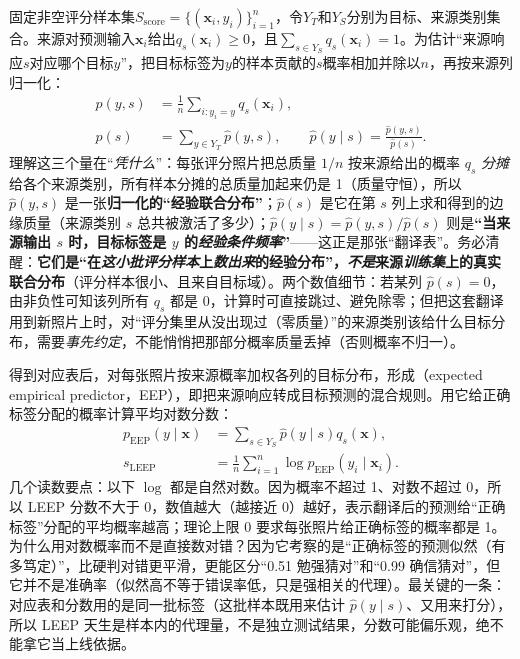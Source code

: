 固定非空评分样本集$S_{\mathrm{score}}=\{(\bm x_i,y_i)\}_{i=1}^{n}$，令$Y_T$和$Y_S$分别为目标、来源类别集合。来源对预测输入$\bm x_i$给出$q_s(\bm x_i)\geq0$，且$\sum_{s\in Y_S}q_s(\bm x_i)=1$。为估计“来源响应$s$对应哪个目标$y$”，把目标标签为$y$的样本贡献的$s$概率相加并除以$n$，再按来源列归一化：
\begin{equation}
  \begin{aligned}
    \hat p(y,s)&=\frac1n\sum_{i:y_i=y}q_s(\bm x_i),\\
    \hat p(s)&=\sum_{y\in Y_T}\hat p(y,s),\qquad
    \hat p(y\mid s)=\frac{\hat p(y,s)}{\hat p(s)}.
  \end{aligned}
  \label{eq:ket-reuse-leep-joint}
\end{equation}
理解这三个量在“\emph{凭什么}”：每张评分照片把总质量 $1/n$ 按来源给出的概率 $q_s$ \emph{分摊}给各个来源类别，所有样本分摊的总质量加起来仍是 1（质量守恒），所以 $\hat p(y,s)$ 是一张\textbf{归一化的“经验联合分布”}；$\hat p(s)$ 是它在第 $s$ 列上求和得到的边缘质量（来源类别 $s$ 总共被激活了多少）；$\hat p(y\mid s)=\hat p(y,s)/\hat p(s)$ 则是\textbf{“当来源输出 $s$ 时，目标标签是 $y$ 的\emph{经验条件频率}”}——这正是那张“翻译表”。务必清醒：\textbf{它们是“在\emph{这小批评分样本}上\emph{数出来}的经验分布”，\emph{不是}来源\emph{训练集}上的真实联合分布}（评分样本很小、且来自目标域）。两个数值细节：若某列 $\hat p(s)=0$，由非负性可知该列所有 $q_s$ 都是 0，计算时可直接跳过、避免除零；但把这套翻译用到新照片上时，对“评分集里从没出现过（零质量）”的来源类别该给什么目标分布，需要\emph{事先约定}，不能悄悄把那部分概率质量丢掉（否则概率不归一）。

得到对应表后，对每张照片按来源概率加权各列的目标分布，形成（expected empirical predictor，EEP），即把来源响应转成目标预测的混合规则。用它给正确标签分配的概率计算平均对数分数：
\begin{equation}
  \begin{aligned}
    p_{\mathrm{EEP}}(y\mid\bm x)
    &=\sum_{s\in Y_S}\hat p(y\mid s)q_s(\bm x),\\
    s_{\mathrm{LEEP}}
    &=\frac1n\sum_{i=1}^{n}
      \log p_{\mathrm{EEP}}(y_i\mid\bm x_i).
  \end{aligned}
  \label{eq:ket-reuse-leep-score}
\end{equation}
几个读数要点：以下 $\log$ 都是自然对数。因为概率不超过 1、对数不超过 0，所以 LEEP 分数不大于 0，数值越大（越接近 0）越好，表示翻译后的预测给“正确标签”分配的平均概率越高；理论上限 0 要求每张照片给正确标签的概率都是 1。为什么用对数概率而不是直接数对错？因为它考察的是“正确标签的预测似然（有多笃定）”，比硬判对错更平滑，更能区分“0.51 勉强猜对”和“0.99 确信猜对”，但它并不是准确率（似然高不等于错误率低，只是强相关的代理）。最关键的一条：对应表和分数用的是同一批标签（这批样本既用来估计 $\hat p(y\mid s)$、又用来打分），所以 LEEP 天生是样本内的代理量，不是独立测试结果，分数可能偏乐观，绝不能拿它当上线依据。

